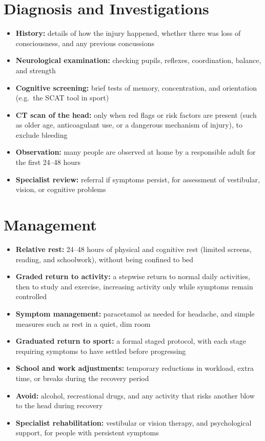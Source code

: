 \section*{Diagnosis and Investigations}
\begin{itemize}
    \item \textbf{History:} details of how the injury happened, whether there was loss of consciousness, and any previous concussions
    \item \textbf{Neurological examination:} checking pupils, reflexes, coordination, balance, and strength
    \item \textbf{Cognitive screening:} brief tests of memory, concentration, and orientation (e.g.\ the SCAT tool in sport)
    \item \textbf{CT scan of the head:} only when red flags or risk factors are present (such as older age, anticoagulant use, or a dangerous mechanism of injury), to exclude bleeding
    \item \textbf{Observation:} many people are observed at home by a responsible adult for the first 24--48 hours
    \item \textbf{Specialist review:} referral if symptoms persist, for assessment of vestibular, vision, or cognitive problems
\end{itemize}

\section*{Management}
\begin{itemize}
    \item \textbf{Relative rest:} 24--48 hours of physical and cognitive rest (limited screens, reading, and schoolwork), without being confined to bed
    \item \textbf{Graded return to activity:} a stepwise return to normal daily activities, then to study and exercise, increasing activity only while symptoms remain controlled
    \item \textbf{Symptom management:} paracetamol as needed for headache, and simple measures such as rest in a quiet, dim room
    \item \textbf{Graduated return to sport:} a formal staged protocol, with each stage requiring symptoms to have settled before progressing
    \item \textbf{School and work adjustments:} temporary reductions in workload, extra time, or breaks during the recovery period
    \item \textbf{Avoid:} alcohol, recreational drugs, and any activity that risks another blow to the head during recovery
    \item \textbf{Specialist rehabilitation:} vestibular or vision therapy, and psychological support, for people with persistent symptoms
\end{itemize}

